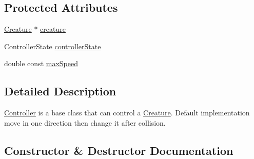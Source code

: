 \subsection*{Protected Attributes}
\begin{DoxyCompactItemize}
\item 
\hyperlink{class_creature}{Creature} $\ast$ \hyperlink{class_controller_a54982a6e6ceaafdd59d72ddd7df013a1}{creature}
\item 
Controller\+State \hyperlink{class_controller_a8300a08c95fc3c2d0804280fd0a4a673}{controller\+State}
\item 
double const \hyperlink{class_controller_ac16d67602af82582f06ffeaf35fa9337}{max\+Speed}
\end{DoxyCompactItemize}


\subsection{Detailed Description}
\hyperlink{class_controller}{Controller} is a base class that can control a \hyperlink{class_creature}{Creature}. Default implementation move in one direction then change it after collision. 

\subsection{Constructor \& Destructor Documentation}
